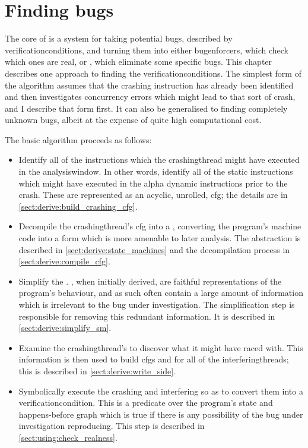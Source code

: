 \chapter{Finding bugs}
\label{sect:derive}


The core of {\technique} is a system for taking potential bugs,
described by \glspl{verificationcondition}, and turning them into
either \glspl{bugenforcer}, which check which ones are real, or
{\genfixes}, which eliminate some specific bugs.  This chapter
describes one approach to finding the \glspl{verificationcondition}.
The simplest form of the algorithm assumes that the crashing
instruction has already been identified and then investigates
concurrency errors which might lead to that sort of crash, and I
describe that form first.  It can also be generalised to finding
completely unknown bugs, albeit at the expense of quite high
computational cost.

The basic algorithm proceeds as follows:

\begin{itemize}
\item Identify all of the instructions which the \gls{crashingthread}
  might have executed in the \gls{analysiswindow}.  In other words,
  identify all of the static instructions which might have executed in
  the \gls{alpha} dynamic instructions prior to the crash.  These are
  represented as an acyclic, unrolled, \gls{cfg}; the details are in
  \autoref{sect:derive:build_crashing_cfg}.
\item Decompile the \gls{crashingthread}'s \gls{cfg} into a
  {\StateMachine}, converting the program's machine code into a form
  which is more amenable to later analysis.  The {\StateMachine}
  abstraction is described in \autoref{sect:derive:state_machines} and
  the decompilation process in \autoref{sect:derive:compile_cfg}.
\item Simplify the {\StateMachine}.  {\STateMachines}, when initially
  derived, are faithful representations of the program's behaviour,
  and as such often contain a large amount of information which is
  irrelevant to the bug under investigation.  The simplification step
  is responsible for removing this redundant information.  It is
  described in \autoref{sect:derive:simplify_sm}.
\item Examine the \gls{crashingthread}'s {\StateMachine} to discover
  what it might have raced with.  This information is then used to
  build \glspl{cfg} and {\StateMachines} for all of the
  \glspl{interferingthread}; this is described in
  \autoref{sect:derive:write_side}.
\item Symbolically execute the crashing and interfering
  {\StateMachines} so as to convert them into a
  \gls{verificationcondition}.  This is a predicate over the program's
  state and happens-before graph which is true if there is any
  possibility of the bug under investigation reproducing.  This step
  is described in \autoref{sect:using:check_realness}.
\end{itemize}


